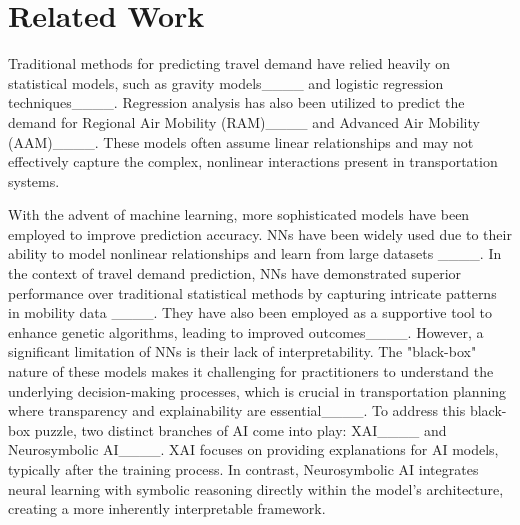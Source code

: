 \section{Related Work}
\label{sec:related_work}

Traditional methods for predicting travel demand have relied heavily on statistical models, such as gravity models____ and logistic regression techniques____. Regression analysis has also been utilized to predict the demand for Regional Air Mobility (RAM)____ and Advanced Air Mobility (AAM)____. These models often assume linear relationships and may not effectively capture the complex, nonlinear interactions present in transportation systems.

With the advent of machine learning, more sophisticated models have been employed to improve prediction accuracy. NNs have been widely used due to their ability to model nonlinear relationships and learn from large datasets ____. In the context of travel demand prediction, NNs have demonstrated superior performance over traditional statistical methods by capturing intricate patterns in mobility data ____. They have also been employed as a supportive tool to enhance genetic algorithms, leading to improved outcomes____. However, a significant limitation of NNs is their lack of interpretability. The "black-box" nature of these models makes it challenging for practitioners to understand the underlying decision-making processes, which is crucial in transportation planning where transparency and explainability are essential____. To address this black-box puzzle, two distinct branches of AI come into play: XAI____ and Neurosymbolic AI____. XAI focuses on providing explanations for AI models, typically after the training process. In contrast, Neurosymbolic AI integrates neural learning with symbolic reasoning directly within the model's architecture, creating a more inherently interpretable framework.


